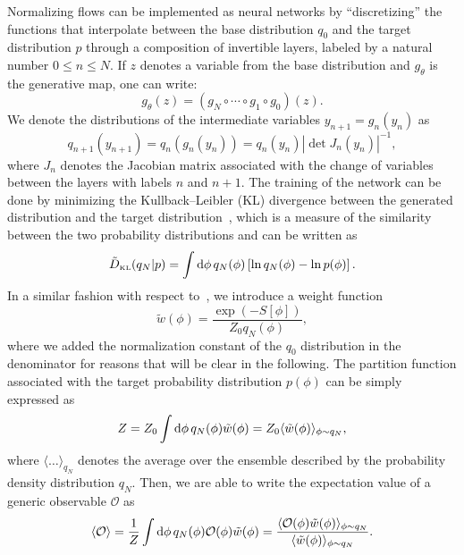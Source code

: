 \documentclass[11pt]{article}
\newcommand{\DKL}{\tilde{D}_{\mbox{\tiny{KL}}}}
\newcommand{\dd}{{\rm{d}}}
\begin{document}
Normalizing flows can be implemented as neural networks by ``discretizing'' the functions that interpolate between the base distribution $q_0$ and the target distribution $p$ through a composition of invertible layers, labeled by a natural number $0 \le n \le N$. If $z$ denotes a variable from the base distribution and $g_\theta$ is the generative map, one can write:
\begin{equation}
\label{eq:norm_flow}
g_\theta (z) = (g_N \circ \cdots \circ g_1 \circ g_0 )(z).
\end{equation}
We denote the distributions of the intermediate variables $y_{n+1}=g_n(y_n)$ as
\begin{equation}
\label{eq:intermediate_dist}
q_{n+1}(y_{n+1})=q_n \left( g_n (y_n) \right) = q_n (y_n )\left| \det J_n (y_n )\right|^{-1},
\end{equation}
where $J_n$ denotes the Jacobian matrix associated with the change of variables between the layers with labels $n$ and $n+1$. The training of the network can be done by minimizing the Kullback--Leibler (KL) divergence between the generated distribution and the target distribution~\cite{Kullback:1951zyt}, which is a measure of the similarity between the two probability distributions and can be written as
\begin{equation}
\label{deterministic_Kullback-Leibler_divergence}
\DKL(q_N|p) = \int \dd \phi \, q_N(\phi) \left[ \ln q_N(\phi) - \ln p(\phi)\right].
\end{equation}
In a similar fashion with respect to~\cite{Nicoli:2020njz}, we introduce a weight function
\begin{equation}
\label{eq:tilde_w}
\tilde{w}(\phi)=\frac{\exp(-S[\phi])}{Z_0 q_N(\phi)},
\end{equation}
where we added the normalization constant of the $q_0$ distribution in the denominator for reasons that will be clear in the following. The partition function associated with the target probability distribution $p(\phi)$ can be simply expressed as
\begin{equation}
\label{eq:Z_neural}
Z = Z_0 \int \dd \phi \, q_N(\phi) \tilde{w}(\phi) = Z_0 \langle \tilde{w}(\phi) \rangle_{\phi \sim q_N},
\end{equation}
where $\langle \dots \rangle_{q_N}$ denotes the average over the ensemble described by the probability density distribution $q_N$. Then, we are able to write the expectation value of a generic observable $\mathcal{O}$ as
\begin{equation}
\label{expectation_value}
\langle \mathcal{O} \rangle = \frac{1}{Z} \int \dd \phi \, q_N(\phi) \mathcal{O}(\phi) \tilde{w}(\phi) = \frac{\langle \mathcal{O}(\phi) \tilde{w}(\phi) \rangle_{\phi \sim q_N}}{\langle \tilde{w}(\phi) \rangle_{\phi \sim q_N}}.
\end{equation}
\end{document}

